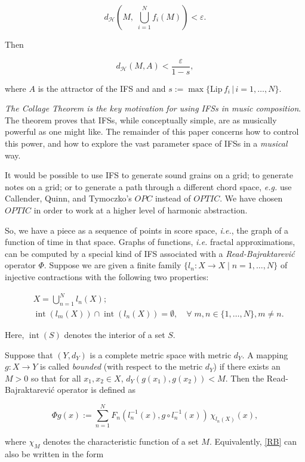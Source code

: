 \documentclass[english,11pt,letterpaper,onecolumn]{scrartcl}
\numberwithin{equation}{section}
\newcommand{\st}{\,|\,}
\newcommand{\calH}{\mathcal{H}}
\newcommand{\Int}{\mathop{\mathrm{int}}}
\newcommand{\be}{\begin{equation}}
\newcommand{\ee}{\end{equation}}
\begin{document}
\be\label{hutchop}
d_\calH \left(M, \;\bigcup_{i=1}^N f_i (M) \right) < \varepsilon.
\ee

\noindent Then

\[
d_\calH (M, A) < \frac{\varepsilon}{1-s},
\]

\noindent where $A$ is the attractor of the IFS and  and $s :=
\max\{\mathrm{Lip}\,f_i\st
i = 1, \ldots, N\}$.

\textit{The Collage Theorem is the key motivation for using IFSs in music
composition}. The theorem proves that IFSs, while conceptually simple, are as
musically powerful as one might like. The remainder of this paper concerns how
to control this power, and how to explore the vast parameter space of IFSs in a
\textit{musical} way.

It would be possible to use IFS to generate sound grains on a grid; to generate
notes on a grid; or to generate a path through a different chord space,
\textit{e.g.} use Callender, Quinn, and Tymoczko's $OPC$ instead of $OPTIC$. We
have chosen $OPTIC$ in order to work at a higher level of harmonic abstraction.

So, we have a piece as a sequence of points in score space, \textit{i.e.}, the
graph of a function of time in that space. Graphs of functions, \textit{i.e.}
fractal approximations, can be computed by a special kind of IFS associated with
a \textit{Read-Bajraktarevi\'c} operator $\Phi$. Suppose we are given a finite
family $\{l_n : X\to X \mid n = 1, \ldots, N\}$ of injective contractions with
the following two properties:

\begin{align}
&X = \bigcup_{n=1}^N l_n(X);\label{union}\\
&\Int (l_m(X))\cap \Int(l_n(X)) = \emptyset, \quad\forall\;m, n\in \{1,\ldots,
N\}, m\neq n.\label{partition}
\end{align}

\noindent Here, $\Int (S)$ denotes the interior of a set $S$.

Suppose that $(Y,d_Y)$ is a complete metric space with metric $d_Y$. A mapping
$g:X\to Y$ is called \emph{bounded} (with respect to the metric $d_Y$) if
there exists an $M > 0$ so that for all $x_1, x_2\in X$, $d_Y(g(x_1),g(x_2)) <
M$. Then the Read-Bajraktarevi\'c operator is defined as

\be\label{RB}
\Phi g (x) := \sum\limits_{n=1}^N F_n (l_n^{-1} (x), g\circ l_n^{-1}
(x))\,\chi_{l_n(X)}(x),
\ee

\noindent where $\chi_M$ denotes the characteristic function of a set $M$.
Equivalently, \eqref{RB} can also be written in the form
\end{document}
